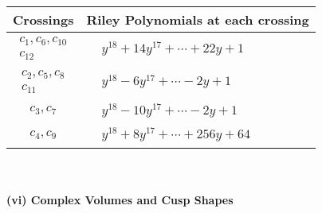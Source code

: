 \documentclass[1p]{elsarticle_modified}
\theoremstyle{definition}
\begin{document}
\begin{tabular}{m{50pt}|m{274pt}}
Crossings & \hspace{64pt}Riley Polynomials at each crossing \\
\hline $$\begin{aligned}c_{1},c_{6},c_{10}\\c_{12}\end{aligned}$$&$\begin{aligned}
&y^{18}+14 y^{17}+\cdots+22 y+1
\end{aligned}$\\
\hline $$\begin{aligned}c_{2},c_{5},c_{8}\\c_{11}\end{aligned}$$&$\begin{aligned}
&y^{18}-6 y^{17}+\cdots-2 y+1
\end{aligned}$\\
\hline $$\begin{aligned}c_{3},c_{7}\end{aligned}$$&$\begin{aligned}
&y^{18}-10 y^{17}+\cdots-2 y+1
\end{aligned}$\\
\hline $$\begin{aligned}c_{4},c_{9}\end{aligned}$$&$\begin{aligned}
&y^{18}+8 y^{17}+\cdots+256 y+64
\end{aligned}$\\
\hline
\end{tabular}\\~\\
\newpage\flushleft \textbf{(vi) Complex Volumes and Cusp Shapes}
\end{document}

